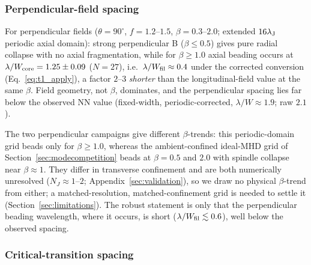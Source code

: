 \documentclass[usenatbib,twoside,twocolumn]{mnras}
\begin{document}
\subsubsection{Perpendicular-field spacing}

For perpendicular fields ($\theta=90^\circ$, $f=1.2$--$1.5$, $\beta=0.3$--$2.0$; extended $16\lambda_{\rm J}$ periodic axial domain): strong perpendicular B ($\beta\leq0.5$) gives pure radial collapse with no axial fragmentation, while for $\beta\geq1.0$ axial beading occurs at $\lambda/W_{\rm core}=1.25\pm0.09$ ($N=27$), i.e.\ $\lambda/W_{\rm fil}\approx0.4$ under the corrected conversion (Eq.~\ref{eq:t1_apply}), a factor $2$--$3$ \textit{shorter} than the longitudinal-field value at the same $\beta$. Field geometry, not $\beta$, dominates, and the perpendicular spacing lies far below the observed NN value (fixed-width, periodic-corrected, $\lambda/W\approx1.9$; raw $2.1$).

The two perpendicular campaigns give different $\beta$-trends: this periodic-domain grid beads only for $\beta\geq1.0$, whereas the ambient-confined ideal-MHD grid of Section~\ref{sec:modecompetition} beads at $\beta=0.5$ and $2.0$ with spindle collapse near $\beta\approx1$. They differ in transverse confinement and are both numerically unresolved ($N_J\approx1$--$2$; Appendix~\ref{sec:validation}), so we draw no physical $\beta$-trend from either; a matched-resolution, matched-confinement grid is needed to settle it (Section~\ref{sec:limitations}). The robust statement is only that the perpendicular beading wavelength, where it occurs, is short ($\lambda/W_{\rm fil}\lesssim0.6$), well below the observed spacing.

\subsubsection{Critical-transition spacing}
\end{document}

